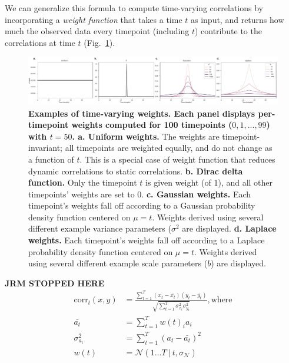 \documentclass[english]{article}
\begin{document}
We can generalize this formula to compute time-varying correlations by
incorporating a \textit{weight function} that takes a time $t$ as input,
and returns how much the observed data every timepoint (including $t$)
contribute to the correlations at time $t$ (Fig.~\ref{fig:weights}).
\begin{figure}
  \centering
  \includegraphics[width=\textwidth]{figs/kernels}
  \caption{\textbf{Examples of time-varying weights.  Each panel
    displays per-timepoint weights computed for 100 timepoints
    ($0, 1, ..., 99$) with $t = 50$.  a. Uniform weights.} The weights
  are timepoint-invariant; all timepoints are weighted equally, and do
  not change as a function of $t$.  This is a special case of weight
  function that reduces dynamic correlations to static correlations.
  \textbf{b. Dirac delta function.} Only the timepoint $t$ is given
  weight (of 1), and all other timepoints' weights are set to 0.
  \textbf{c. Gaussian weights.} Each timepoint's weights fall off
  according to a Gaussian probability density function centered on
  $\mu = t$.  Weights derived using several different example variance
  parameters ($\sigma^2$ are displayed.  \textbf{d. Laplace weights.}
  Each timepoint's weights fall off according to a Laplace probability
  density function centered on $\mu = t$.  Weights derived using
  several different example scale parameters ($b$) are displayed.}
  \label{fig:weights}
\end{figure}


\textbf{JRM STOPPED HERE}
\begin{align}
\mathrm{corr}_t(x,y) &= \frac{\sum_{t=1}^T \left( x_t - \bar{x_t} \right) \left( y_t - \bar{y_t} \right)}{\sqrt{\sum_{t=1}^{T}\sigma ^{2}_{x_{t}}\sigma ^{2}_{y_{t}}}}\mathrm{, where}\\
\bar{a_t} &= \sum_{t=1}^T w(t)_i a_i\\
\sigma^{2}_{a_t} &= \sum_{t=1}^{T} \left(a_t - \bar{a_t} \right)^2\\
w(t) &= \mathcal{N}\left(1...T ~|~ t, \sigma_\mathcal{N}\right) %
\end{align}
\end{document}
